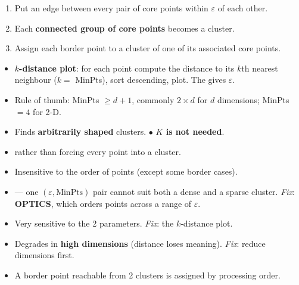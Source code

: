 {\begin{enumerate}
  \item Put an edge between every pair of core points within $\varepsilon$ of each other.
  \item Each \textbf{connected group of core points} becomes a cluster.
  \item Assign each border point to a cluster of one of its associated core points.
\end{enumerate}
\begin{itemize}
  \item \textbf{$k$-distance plot}: for each point compute the distance to its $k$th nearest
        neighbour ($k =$ MinPts), sort descending, plot. The  gives $\varepsilon$.
  \item Rule of thumb: MinPts $\ge d+1$, commonly $2\times d$ for $d$ dimensions; MinPts $=4$ for 2-D.
\end{itemize}
\begin{itemize}
  \item Finds \textbf{arbitrarily shaped} clusters. \quad $\bullet$ \textbf{$K$ is not needed}.
  \item {} rather than forcing every point into a cluster.
  \item Insensitive to the order of points (except some border cases).
\end{itemize}
\begin{itemize}
  \item {} --- one $(\varepsilon,\text{MinPts})$ pair cannot
        suit both a dense and a sparse cluster. \emph{Fix}: \textbf{OPTICS}, which orders points
        across a range of $\varepsilon$.
  \item Very sensitive to the 2 parameters. \emph{Fix}: the $k$-distance plot.
  \item Degrades in \textbf{high dimensions} (distance loses meaning). \emph{Fix}: reduce dimensions first.
  \item A border point reachable from 2 clusters is assigned by processing order.
\end{itemize}}

\hr


{\color{sub}\footnotesize {} }

